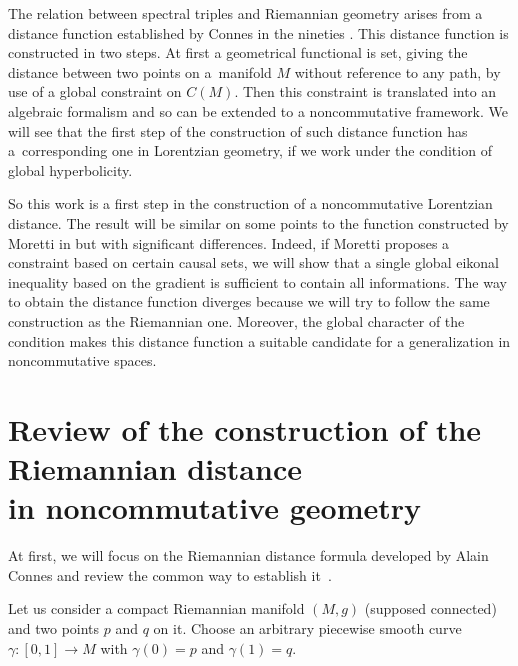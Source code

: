 \documentclass[pdftex]{sigma}
\begin{document}
The relation between spectral triples and Riemannian geometry arises from a distance function established by Connes in the nineties \cite{C94,C96}. This distance function is constructed in two steps. At f\/irst a geometrical functional is set, giving the distance between two points on a~mani\-fold $M$ without reference to any path, by use of a global constraint on $C(M)$. Then this constraint is translated into an algebraic formalism and so can be extended to a noncommutative framework. We will see that the f\/irst step of the construction of such distance function has a~corresponding one in Lorentzian geometry, if we work under the condition of global hyper\-boli\-city.

So this work is a f\/irst step in the construction of a noncommutative Lorentzian distance. The result will be similar on some points to the function constructed by Moretti in \cite{Mor} but with signif\/icant dif\/ferences. Indeed, if Moretti proposes a constraint based on certain causal sets, we will show that a single global eikonal inequality based on the gradient is suf\/f\/icient to contain all informations. The way to obtain the distance function diverges because we will try to follow the same construction as the Riemannian one. Moreover, the global character of the condition makes this distance function a suitable candidate for a generalization in noncommutative spaces.


\section{Review of the construction of the Riemannian distance\\ in noncommutative geometry}

At f\/irst, we will focus on the Riemannian distance formula developed by Alain Connes \cite{C94,C96} and review the common way to establish it~\cite{Var}.

Let us consider a compact Riemannian manifold $(M,g)$ (supposed connected) and two points $p$ and $q$ on it. Choose an arbitrary piecewise smooth curve $\gamma : [0,1] \rightarrow M$ with $\gamma(0) = p$ and $\gamma(1) = q$.
\end{document}

